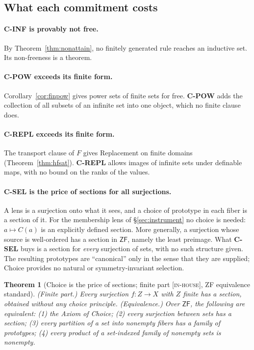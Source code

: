 \documentclass[11pt]{article}
\newcommand{\gradetag}[1]{\textnormal{\textsc{[#1]}}}
\newcommand{\inhouse}{\gradetag{in-house}}
\newtheorem{theorem}{Theorem}[section]
\theoremstyle{definition}
\begin{document}
\subsection{What each commitment costs}

\paragraph{C-INF is provably not free.} By Theorem~\ref{thm:nonattain}, no finitely generated
rule reaches an inductive set. Its non-freeness is a theorem.

\paragraph{C-POW exceeds its finite form.} Corollary~\ref{cor:finpow} gives power sets of finite
sets for free. \textbf{C-POW} adds the collection of all subsets of an infinite set into one
object, which no finite clause does.

\paragraph{C-REPL exceeds its finite form.} The transport clause of $F$ gives Replacement on
finite domains (Theorem~\ref{thm:hfsat}). \textbf{C-REPL} allows images of infinite sets under
definable maps, with no bound on the ranks of the values.

\paragraph{C-SEL is the price of sections for all surjections.} A lens is a surjection onto what
it sees, and a choice of prototype in each fiber is a section of it. For the membership lens of
\S\ref{sec:instrument} no choice is needed: $a\mapsto C(a)$ is an explicitly defined section.
More generally, a surjection whose source is well-ordered has a section in $\mathsf{ZF}$, namely
the least preimage. What \textbf{C-SEL} buys is a section for \emph{every} surjection of sets,
with no such structure given. The resulting prototypes are ``canonical'' only in the sense that
they are supplied; Choice provides no natural or symmetry-invariant selection.

\begin{theorem}[Choice is the price of sections; finite part \inhouse, ZF equivalence standard]\label{thm:choice}
\emph{(Finite part.)} Every surjection $f\colon Z\to X$ with $Z$ finite has a section, obtained
without any choice principle. \emph{(Equivalence.)} Over $\mathsf{ZF}$, the following are
equivalent: \textup{(1)} the Axiom of Choice; \textup{(2)} every surjection between sets has a
section; \textup{(3)} every partition of a set into nonempty fibers has a family of prototypes;
\textup{(4)} every product of a set-indexed family of nonempty sets is nonempty.
\end{theorem}
\end{document}
